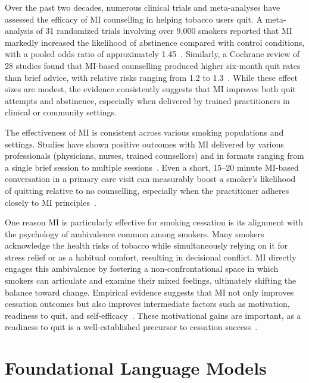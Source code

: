Over the past two decades, numerous clinical trials and meta-analyses have assessed the efficacy of MI counselling in helping tobacco users quit. A meta-analysis of 31 randomized trials involving over 9,000 smokers reported that MI markedly increased the likelihood of abstinence compared with control conditions, with a pooled odds ratio of approximately 1.45~\cite{Heckman2010}. Similarly, a Cochrane review of 28 studies found that MI-based counselling produced higher six-month quit rates than brief advice, with relative risks ranging from 1.2 to 1.3~\cite{Lindson2015}. While these effect sizes are modest, the evidence consistently suggests that MI improves both quit attempts and abstinence, especially when delivered by trained practitioners in clinical or community settings.

The effectiveness of MI is consistent across various smoking populations and settings. Studies have shown positive outcomes with MI delivered by various professionals (physicians, nurses, trained counsellors) and in formats ranging from a single brief session to multiple sessions~\cite{Lindson2015}. Even a short, 15–20 minute MI-based conversation in a primary care visit can measurably boost a smoker's likelihood of quitting relative to no counselling, especially when the practitioner adheres closely to MI principles~\cite{zanjani2008effectiveness}.


One reason MI is particularly effective for smoking cessation is its alignment with the psychology of ambivalence common among smokers. Many smokers acknowledge the health risks of tobacco while simultaneously relying on it for stress relief or as a habitual comfort, resulting in decisional conflict. MI directly engages this ambivalence by fostering a non-confrontational space in which smokers can articulate and examine their mixed feelings, ultimately shifting the balance toward change. Empirical evidence suggests that MI not only improves cessation outcomes but also improves intermediate factors such as motivation, readiness to quit, and self-efficacy~\cite{Boudreaux2012, Hettema2005}. These motivational gains are important, as a readiness to quit is a well-established precursor to cessation success~\cite{West2006}.




\section{Foundational Language Models} \label{sec:foundational_models}


